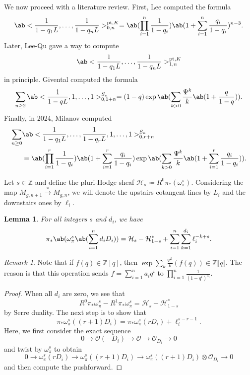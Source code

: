 \documentclass{amsart}
\newtheorem{lem}[thm]{Lemma}
\theoremstyle{definition}
\theoremstyle{remark}
\newtheorem{rmk}[thm]{Remark}
\theoremstyle{plain}
\theoremstyle{definition}
\theoremstyle{remark}
\newcommand{\Z}{\mathbb{Z}}
\newcommand{\mc}[1]{\mathcal{#1}}
\newcommand{\mr}[1]{\mathrm{#1}}
\newcommand{\1}{\mathbf{1}}
\newcommand{\2}{\mathbf{2}}
\newcommand{\3}{\mathbf{3}}
\newcommand{\ps}[1]{\llbracket #1 \rrbracket}
\begin{document}
We now proceed with a literature review. First, Lee computed the formula
\[ \ab<\frac{1}{1-q_1 L}, \ldots, \frac{1}{1-q_n L}>_{0,n}^{\mr{pt}, K} = \ab(\prod_{i=1}^n \frac{1}{1-q_i}) \ab(1 + \sum_{i=1}^n \frac{q_i}{1-q_i})^{n-3}. \]
Later, Lee-Qu gave a way to compute
\[ \ab<\frac{1}{1-q_1 L}, \ldots, \frac{1}{1-q_n L}>_{1,n}^{\mr{pt}, K} \]
in principle. Givental computed the formula
\[ \sum_{n \geq 2} \ab<\frac{1}{1-q L}, 1, \ldots, 1>_{0,1+n}^{S_n} = (1-q) \exp\ab(\sum_{k > 0} \frac{\Psi^k}{k} \ab(1 + \frac{q}{1-q})). \]
Finally, in 2024, Milanov computed 
\begin{align*}
    \sum_{n \geq 0}& \ab<\frac{1}{1-q_1 L}, \ldots, \frac{1}{1-q_r L}, 1, \ldots, 1>_{0,r+n}^{S_n} \\
    &= \ab(\prod_{i=1}^{r} \frac{1}{1-q_i})\ab(1 + \sum_{i=1}^r \frac{q_i}{1-q_i}) \exp\ab(\sum_{k > 0} \frac{\Psi^k}{k} \ab(1 + \sum_{i=1}^r \frac{q_i}{1-q_i})). 
\end{align*}

Let \(s \in \Z\) and define the pluri-Hodge sheaf \(\mc{H}_s \coloneqq R^0 \pi_* (\omega_{\pi}^s)\). Considering the map \(\bar{M}_{g,n+1} \xrightarrow{\pi} \bar{M}_{g,n}\), we will denote the upstairs cotangent lines by \(L_i\) and the downstairs ones by \(\ell_i\).

\begin{lem}
    For all integers \(s\) and \(d_i\), we have
    \[ \pi_*\ab(\omega_{\pi}^s\ab(\sum_{i=1}^n d_i D_i)) = \mc{H}_s-\mc{H}_{1-s}^* + \sum_{i=1}^n \sum_{k=1}^{d_i} \ell_i^{-k+s}. \]
\end{lem}

\begin{rmk}
    Note that if \(f(q) \in \Z[q]\), then \(\exp \sum_k \frac{\Psi^k}{k} (f(q)) \in \Z \ps{q}\). The reason is that this operation sends \(f = \sum_{i=1}^{n} a_i q^i\) to \(\prod_{i=1}^n \frac{1}{(1-q^i)^{a_i}}\).
\end{rmk}

\begin{proof}
    When all \(d_i\) are zero, we see that
    \[ R^0 \pi_* \omega_{\pi}^s - R^1 \pi_* \omega_{\pi}^s = \mc{H}_s - \mc{H}_{1-s}^* \]
    by Serre duality. The next step is to show that
    \[ \pi_* \omega_{\pi}^s ((r+1)D_i) = \pi_* \omega_{\pi}^s(r D_i) + \ell_i^{s-r-1}. \]
    Here, we first consider the exact sequence
    \[ 0 \to \mc{O} (-D_i) \to \mc{O} \to \mc{O}_{D_i} \to 0 \]
    and twist by \(\omega_{\pi}^s\) to obtain
    \[ 0 \to \omega_{\pi}^s(r D_i) \to \omega_{\pi}^s ((r+1)D_i) \to \omega_{\pi}^s ((r+1)D_i) \otimes \mc{O}_{D_i} \to 0 \]
    and then compute the pushforward.
\end{proof}
\end{document}
